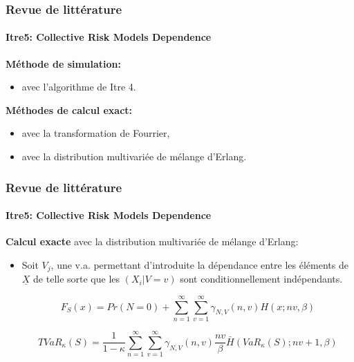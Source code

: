 \documentclass[11pt]{beamer}
\begin{document}
\begin{frame}
	\frametitle{Revue de littérature}
	\framesubtitle{Itre5: Collective Risk Models Dependence \cite{Itre5}}
	
	\textbf{Méthode de simulation:}
	\begin{itemize}
		\item avec l'algorithme de Itre 4.
	\end{itemize}
	\vspace{0.2cm}
	
	\textbf{Méthodes de calcul exact:}
	\begin{itemize}
		\item avec la transformation de Fourrier,
		\item avec la distribution multivariée de mélange d'Erlang.
		
	\end{itemize}

	
	
\end{frame}


\begin{frame}
	\frametitle{Revue de littérature}
	\framesubtitle{Itre5: Collective Risk Models Dependence \cite{Itre5}}
	
	\textbf{Calcul exacte} avec la distribution multivariée de mélange d'Erlang:\\
	
	\begin{itemize}
		\item Soit $V_j$, une v.a. permettant d'introduite la dépendance entre les éléments de $\underline{X}$ de telle sorte que les $(X_i|V=v)$ sont conditionnellement indépendants.
		
		\begin{equation*}
		F_S(x) = Pr(N=0) + \sum_{n=1}^{\infty} \sum_{v=1}^{\infty} \gamma_{N,V}(n,v) H(x; nv, \beta)
		\end{equation*}
		
		\begin{equation*}
		TVaR_{\kappa}(S) = \frac{1}{1-\kappa} \sum_{n=1}^{\infty} \sum_{v=1}^{\infty} \gamma_{N,V}(n,v) \frac{nv}{\beta} \bar{H}(VaR_{\kappa}(S); nv + 1, \beta)
		\end{equation*}
		
	\end{itemize}
\end{frame}
\end{document}
